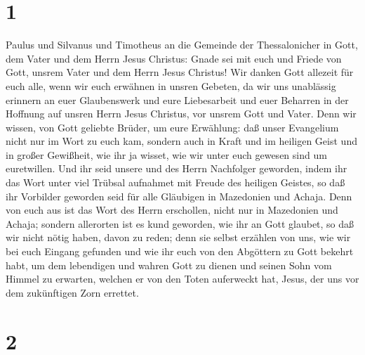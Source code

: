 \hypertarget{section}{%
\section{1}\label{section}}

 Paulus und Silvanus und Timotheus an die Gemeinde der
Thessalonicher in Gott, dem Vater und dem Herrn Jesus Christus: Gnade
sei mit euch und Friede von Gott, unsrem Vater und dem Herrn Jesus
Christus!  Wir danken Gott allezeit für euch alle, wenn
wir euch erwähnen in unsren Gebeten,  da wir uns
unablässig erinnern an euer Glaubenswerk und eure Liebesarbeit und euer
Beharren in der Hoffnung auf unsren Herrn Jesus Christus, vor unsrem
Gott und Vater.  Denn wir wissen, von Gott geliebte
Brüder, um eure Erwählung:  daß unser Evangelium nicht nur
im Wort zu euch kam, sondern auch in Kraft und im heiligen Geist und in
großer Gewißheit, wie ihr ja wisset, wie wir unter euch gewesen sind um
euretwillen.  Und ihr seid unsere und des Herrn Nachfolger
geworden, indem ihr das Wort unter viel Trübsal aufnahmet mit Freude des
heiligen Geistes,  so daß ihr Vorbilder geworden seid für
alle Gläubigen in Mazedonien und Achaja.  Denn von euch
aus ist das Wort des Herrn erschollen, nicht nur in Mazedonien und
Achaja; sondern allerorten ist es kund geworden, wie ihr an Gott
glaubet, so daß wir nicht nötig haben, davon zu reden; 
denn sie selbst erzählen von uns, wie wir bei euch Eingang gefunden und
wie ihr euch von den Abgöttern zu Gott bekehrt habt, um dem lebendigen
und wahren Gott zu dienen  und seinen Sohn vom Himmel zu
erwarten, welchen er von den Toten auferweckt hat, Jesus, der uns vor
dem zukünftigen Zorn errettet.

\hypertarget{section-1}{%
\section{2}\label{section-1}}


